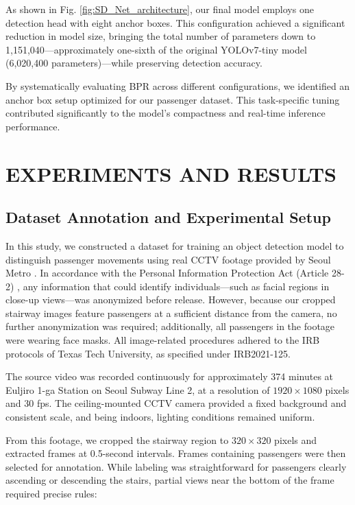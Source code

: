 \documentclass[journal,twoside,web]{ieeecolor}
\begin{document}
As shown in Fig. \ref{fig:SD_Net_architecture}, our final model employs one detection head with eight anchor boxes. This configuration achieved a significant reduction in model size, bringing the total number of parameters down to 1,151,040—approximately one-sixth of the original YOLOv7-tiny model (6,020,400 parameters)—while preserving detection accuracy.

By systematically evaluating \ac{BPR} across different configurations, we identified an anchor box setup optimized for our passenger dataset. This task-specific tuning contributed significantly to the model’s compactness and real-time inference performance.


\section{EXPERIMENTS AND RESULTS}
\subsection{Dataset Annotation and Experimental Setup}
In this study, we constructed a dataset for training an object detection model to distinguish passenger movements using real \ac{CCTV} footage provided by Seoul Metro \cite{seoulmetro_website}. In accordance with the Personal Information Protection Act (Article 28-2) \cite{ministry_of_the_interior_and_safety_personal_nodate}, any information that could identify individuals—such as facial regions in close-up views—was anonymized before release. However, because our cropped stairway images feature passengers at a sufficient distance from the camera, no further anonymization was required; additionally, all passengers in the footage were wearing face masks. All image-related procedures adhered to the \ac{IRB} protocols 
of Texas Tech University, as specified under IRB2021-125.

The source video was recorded continuously for approximately 374 minutes at Euljiro 1-ga Station on Seoul Subway Line 2, at a resolution of $1920 \times 1080$ pixels and 30 \ac{fps}. The 
ceiling-mounted \ac{CCTV} camera provided a fixed background and 
consistent scale, and being indoors, lighting conditions remained uniform.

From this footage, we cropped the stairway region to $320 \times 320$ pixels and extracted frames at 0.5-second intervals. Frames containing passengers were then selected for annotation. While 
labeling was straightforward for passengers clearly ascending or descending the stairs, partial views near the bottom of the frame required precise rules:
\end{document}
